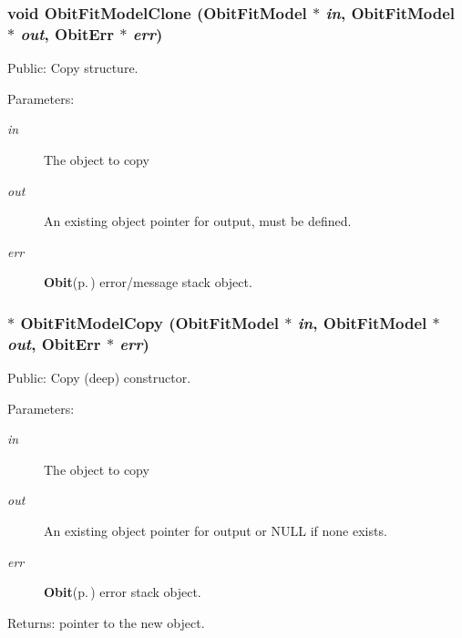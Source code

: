\subsubsection{\setlength{\rightskip}{0pt plus 5cm}void Obit\-Fit\-Model\-Clone ({\bf Obit\-Fit\-Model} $\ast$ {\em in}, {\bf Obit\-Fit\-Model} $\ast$ {\em out}, {\bf Obit\-Err} $\ast$ {\em err})}\label{ObitFitModel_8c_a10}


Public: Copy structure. 

\begin{Desc}
\item[Parameters:]
\begin{description}
\item[{\em in}]The object to copy \item[{\em out}]An existing object pointer for output, must be defined. \item[{\em err}]{\bf Obit}{\rm (p.\,\pageref{structObit})} error/message stack object. \end{description}
\end{Desc}
\subsubsection{$\ast$ Obit\-Fit\-Model\-Copy ({\bf Obit\-Fit\-Model} $\ast$ {\em in}, {\bf Obit\-Fit\-Model} $\ast$ {\em out}, {\bf Obit\-Err} $\ast$ {\em err})}\label{ObitFitModel_8c_a9}


Public: Copy (deep) constructor. 

\begin{Desc}
\item[Parameters:]
\begin{description}
\item[{\em in}]The object to copy \item[{\em out}]An existing object pointer for output or NULL if none exists. \item[{\em err}]{\bf Obit}{\rm (p.\,\pageref{structObit})} error stack object. \end{description}
\end{Desc}
\begin{Desc}
\item[Returns:]pointer to the new object. \end{Desc}
